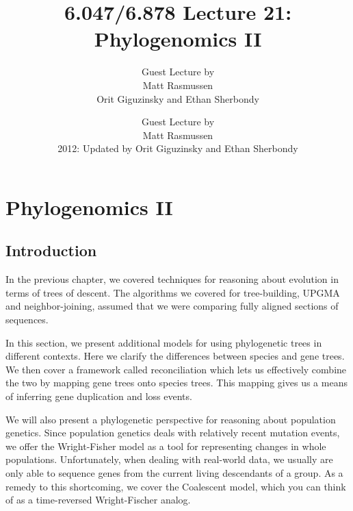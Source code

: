 \ifdefined\isstandalone
\title{6.047/6.878 Lecture 21: Phylogenomics II {\tmabbr{}}}
\author{Guest Lecture by\\
  Matt Rasmussen \\
  Orit Giguzinsky and Ethan Sherbondy}
\maketitle
{}
\lhead{}
\rhead{}
{\pagebreak}
{\tableofcontents}
{\pagebreak}
{\listoffigures}
\else
\chapter{Phylogenomics II}
\author{Guest Lecture by\\
  Matt Rasmussen \\
  2012: Updated by Orit Giguzinsky and Ethan Sherbondy}
\lhead{} 
\rhead{} 
\minilof
\fi 
\pagestyle{fancy} 

\ifdefined\isstandalone
\def\@mydir{images} 
\fi
\ifdefined\ischapter
\def\@mydir{../Lecture21_Phylogenomics/images} 
\fi 
\ifdefined\ismaster
\def\@mydir{Lecture21_Phylogenomics/images} 
\fi 
\section{Introduction}

In the previous chapter, we covered techniques for reasoning about evolution in terms of trees of descent. The algorithms we covered for tree-building, UPGMA and neighbor-joining, assumed that we were comparing fully aligned sections of sequences.

In this section, we present additional models for using phylogenetic trees in different contexts. Here we clarify the differences between species and gene trees. We then cover a framework called reconciliation which lets us effectively combine the two by mapping gene trees onto species trees. This mapping gives us a means of inferring gene duplication and loss events.

We will also present a phylogenetic perspective for reasoning about population genetics. Since population genetics deals with relatively recent mutation events, we offer the Wright-Fisher model as a tool for representing changes in whole populations. Unfortunately, when dealing with real-world data, we usually are only able to sequence genes from the current living descendants of a group. As a remedy to this shortcoming, we cover the Coalescent model, which you can think of as a time-reversed Wright-Fischer analog.

